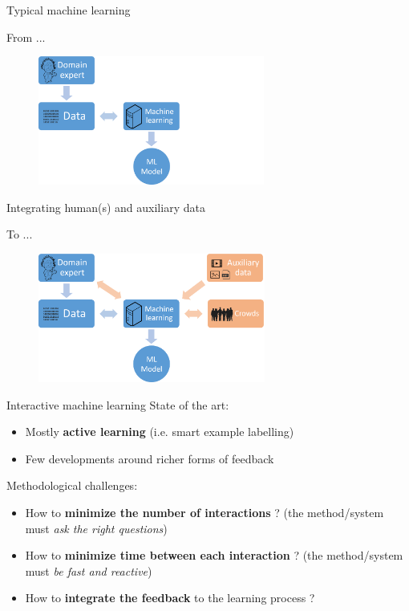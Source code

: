 \documentclass{beamer}
\begin{document}
  
\begin{frame}{Typical machine learning}
	
	From ... 
	
	\begin{figure}[h]
		\includegraphics[height=160px]{images/ml_typical.png}
	\end{figure}
	

\end{frame}

\begin{frame}{Integrating human(s) and auxiliary data}
	
	To ... 
	
	\begin{figure}
		\includegraphics[height=160px]{images/ml_expert_crowds_aux_all.png}
	\end{figure}	
	
\end{frame}

\begin{frame}{Interactive machine learning}
	State of the art:
	\begin{itemize}
		\item Mostly \textbf{active learning} (i.e. smart example labelling)
		\item Few developments around richer forms of feedback
	\end{itemize}		
	\vfill
	Methodological challenges:
	\begin{itemize}
		\item How to \textbf{minimize the number of interactions} ? {\small(the method/system must \textit{ask the right questions})}
		\item How to \textbf{minimize time between each interaction} ? {\small(the method/system must \textit{be fast and reactive})}
		\item How to \textbf{integrate the feedback} to the learning process ?
	\end{itemize}

\end{frame}
\end{document}

